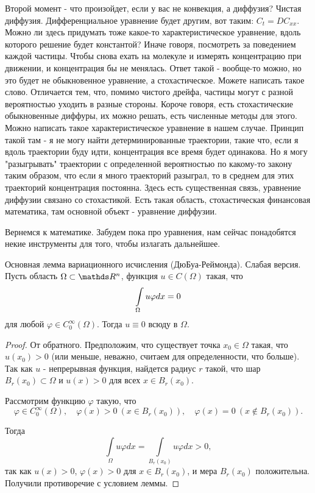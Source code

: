 Второй момент - что произойдет, если у вас не конвекция, а диффузия? Чистая диффузия. Дифференциальное уравнение будет другим, вот таким: $C_t = DC_{xx}$. Можно ли здесь придумать тоже какое-то характеристическое уравнение, вдоль которого решение будет константой? Иначе говоря, посмотреть за поведением каждой частицы. Чтобы снова ехать на молекуле и измерять концентрацию при движении, и концентрация бы не менялась. Ответ такой - вообще-то можно, но это будет не обыкновенное уравнение, а стохастическое. Можете написать такое слово. Отличается тем, что, помимо чистого дрейфа, частицы могут с разной вероятностью уходить в разные стороны. Короче говоря, есть стохастические обыкновенные диффуры, их можно решать, есть численные методы для этого.
Можно написать такое характеристическое уравнение в нашем случае. Принцип такой там - я не могу найти детерминированные траектории, такие что, если я вдоль траектории буду идти, концентрация все время будет одинакова. Но я могу "разыгрывать" траектории с определенной вероятностью по какому-то закону таким образом, что если я много траекторий разыграл, то в среднем для этих траекторий концентрация постоянна. Здесь есть существенная связь, уравнение диффузии связано со стохастикой. Есть такая область, стохастическая финансовая математика, там основной объект - уравнение диффузии.

Вернемся к математике. Забудем пока про уравнения, нам сейчас понадобятся некие инструменты для того, чтобы излагать дальнейшее.

\begin{lemma}{Основная лемма вариационного исчисления (ДюБуа-Реймонда). Слабая версия.}
Пусть область $\Omega \subset \real^n$, функция $u \in C(\Omega)$ такая, что 
$$\displaystyle \int \limits_{\Omega} u \varphi dx = 0$$ 
для любой $\varphi \in C_0^\infty(\Omega)$. Тогда $u \equiv 0$ всюду в $\Omega$.
\end{lemma}

\begin{proof}
От обратного. Предположим, что существует точка $x_0 \in \Omega$ такая, что $u(x_0) > 0$ (или меньше, неважно, считаем для определенности, что больше). 
Так как $u$ - непрерывная функция, найдется радиус $r$ такой, что шар $B_r(x_0) \subset \Omega$ и $u(x) > 0$ для всех $x \in B_r(x_0)$.

Рассмотрим функцию $\varphi$ такую, что 
$$\varphi \in C_0^\infty(\Omega),\quad \varphi(x) > 0 \ (x \in B_r(x_0)),\quad \varphi(x) = 0 \ (x \notin B_r(x_0)).$$

Тогда
$$\int \limits_{\Omega} u \varphi dx = \int \limits_{B_r(x_0)} u \varphi dx > 0,$$ 
так как $u(x) > 0$, $\varphi(x) > 0$ для $x \in B_r(x_0)$, и мера $B_r(x_0)$ положительна. Получили противоречие с условием леммы.
\end{proof}

